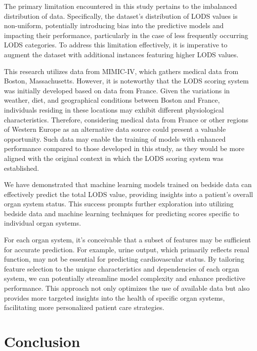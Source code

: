 \documentclass[12pt,a4paper,english
]{tunithesis}
\begin{document}
The primary limitation encountered in this study pertains to the imbalanced distribution of data. Specifically, the dataset's distribution of LODS values is non-uniform, potentially introducing bias into the predictive models and impacting their performance, particularly in the case of less frequently occurring LODS categories. To address this limitation effectively, it is imperative to augment the dataset with additional instances featuring higher LODS values. 

This research utilizes data from MIMIC-IV, which gathers medical data from Boston, Massachusetts. However, it is noteworthy that the LODS scoring system was initially developed based on data from France. Given the variations in weather, diet, and geographical conditions between Boston and France, individuals residing in these locations may exhibit different physiological characteristics. Therefore, considering medical data from France or other regions of Western Europe as an alternative data source could present a valuable opportunity. Such data may enable the training of models with enhanced performance compared to those developed in this study, as they would be more aligned with the original context in which the LODS scoring system was established. 

We have demonstrated that machine learning models trained on bedside data can effectively predict the total LODS value, providing insights into a patient's overall organ system status. This success prompts further exploration into utilizing bedside data and machine learning techniques for predicting scores specific to individual organ systems.

For each organ system, it's conceivable that a subset of features may be sufficient for accurate prediction. For example, urine output, which primarily reflects renal function, may not be essential for predicting cardiovascular status. By tailoring feature selection to the unique characteristics and dependencies of each organ system, we can potentially streamline model complexity and enhance predictive performance. This approach not only optimizes the use of available data but also provides more targeted insights into the health of specific organ systems, facilitating more personalized patient care strategies.

 

\chapter{Conclusion}
\label{ch:conclusion}
\end{document}
